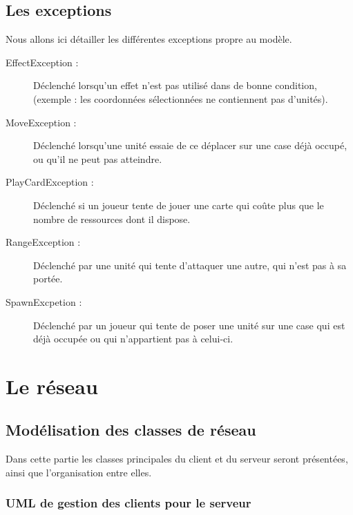 \documentclass[a4paper, titlepage]{livret}
\begin{document}
      \section{Les exceptions}
        Nous allons ici détailler les différentes exceptions propre au modèle.
        \begin{description}
          \item[EffectException : ]Déclenché lorsqu’un effet n’est pas utilisé dans de bonne condition, (exemple : les coordonnées sélectionnées ne contiennent pas d’unités).
          \item[MoveException : ]Déclenché lorsqu'une unité essaie de ce déplacer sur une case déjà occupé, ou qu'il ne peut pas atteindre.
          \item[PlayCardException : ]Déclenché si un joueur tente de jouer une carte qui coûte plus que le nombre de ressources dont il dispose.
          \item[RangeException : ]Déclenché par une unité qui tente d'attaquer une autre, qui n'est pas à sa portée.
          \item[SpawnExcpetion :]Déclenché par un joueur qui tente de poser une unité sur une case qui est déjà occupée ou qui n'appartient pas à celui-ci.
        \end{description}
        




\chapter{Le réseau}

\section{Modélisation des classes de réseau}
Dans cette partie les classes principales du client et du serveur seront présentées, ainsi que l'organisation entre elles.
\subsection{UML de gestion des clients pour le serveur}
\end{document}
